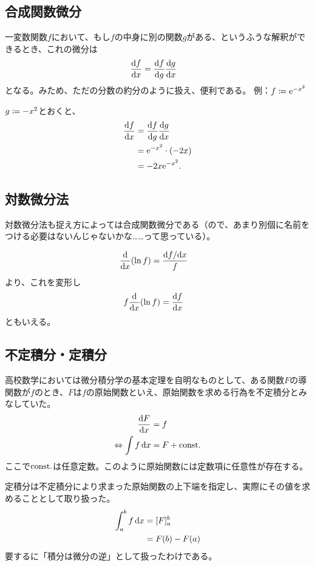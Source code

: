 \subsection{合成関数微分}
一変数関数$f$において、もし$f$の中身に別の関数$g$がある、というふうな解釈ができるとき、これの微分は
\begin{align}
    \frac{\mathrm{d}f}{\mathrm{d}x} & =\frac{\mathrm{d}f}{\mathrm{d}g}\frac{\mathrm{d}g}{\mathrm{d}x}\label{eq:1.4}
\end{align}
となる。みため、ただの分数の約分のように扱え、便利である。
\baselineskip
例：$f\coloneqq\mathrm{e}^{-x^2}$

$g\coloneqq-x^2$とおくと、
\begin{align*}
    \diff{f}{x} & =\diff{f}{g}\diff{g}{x}           \\
                & =\mathrm{e}^{-x^2}\cdot\pare{-2x} \\
                & =-2x\mathrm{e}^{-x^2}.
\end{align*}
\subsection{対数微分法}
対数微分法も捉え方によっては合成関数微分である（ので、あまり別個に名前をつける必要はないんじゃないかな……って思っている）。

\begin{align*}
    \opdiff{x}\pare{\ln f} & =\frac{\df/\dx}{f}
\end{align*}
より、これを変形し
\begin{align}
    f\opdiff{x}\pare{\ln f} & =\diff{f}{x}
\end{align}
ともいえる。

\subsection{不定積分・定積分}
高校数学においては微分積分学の基本定理を自明なものとして、ある関数$F$の導関数が$f$のとき、$F$は$f$の原始関数といえ、原始関数を求める行為を不定積分とみなしていた。
\begin{align}
    \begin{aligned}
        \frac{\mathrm{d}F}{\mathrm{d}x}                 & =f        \\
        \Leftrightarrow \int f\,\mathrm{d}x & =F+\mathrm{const.}
    \end{aligned}\label{eq:1.5}
\end{align}
ここで$\mathrm{const.}$は任意定数。このように原始関数には定数項に任意性が存在する。

定積分は不定積分により求まった原始関数の上下端を指定し、実際にその値を求めることとして取り扱った。
\begin{align}
    \begin{aligned}
        \int_a^b f\,\dx & =[F]_a^b             \\
                        & =F\pare{b}-F\pare{a}
    \end{aligned}\label{eq:1.6}
\end{align}
要するに「積分は微分の逆」として扱ったわけである。
